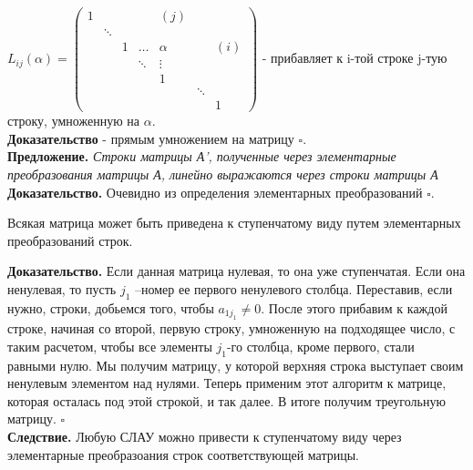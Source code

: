 $L_{ij}(\alpha)=
\left(\begin{array}{ccccccc}
1&&&&(j)&&\\
&\ddots&&&&&\\
&&1&\ldots&\alpha&&(i)\\
&&&\ddots&\vdots&&\\
&&&&1&&\\
&&&&&\ddots&\\
&&&&&&1
\end{array}\right)
$ - прибавляет к i-той строке j-тую строку, умноженную на $\alpha$.\\
\textbf{Доказательство} - прямым умножением на матрицу $\square$.\\
\textbf{Предложение.} \textit{Строки матрицы А’, полученные через элементарные
преобразования матрицы А, линейно выражаются через строки матрицы А}\\
\textbf{Доказательство.} Очевидно из определения элементарных преобразований
$\square$.
\begin{theor} \label{priv}
Всякая матрица может быть приведена к ступенчатому виду путем элементарных
преобразований строк.
\end{theor}
\textbf{Доказательство.} Если данная матрица нулевая, то она уже ступенчатая.
Если она ненулевая, то пусть $j_1$ –номер ее первого
ненулевого столбца. Переставив, если нужно, строки, добьемся того,
чтобы $a_{1j_1}\ne0$. После этого прибавим к каждой строке, начиная со второй,
первую строку, умноженную на подходящее число, с таким
расчетом, чтобы все элементы $j_1$-го столбца, кроме первого, стали
равными нулю. Мы получим матрицу, у которой верхняя строка выступает своим
ненулевым элементом над нулями. Теперь применим этот алгоритм к матрице, 
которая осталась под этой строкой, и так далее. В итоге получим треугольную 
матрицу. $\square$\\
\textbf{Следствие.} Любую СЛАУ можно привести к ступенчатому виду через 
элементарные преобразоания строк соответствующей матрицы.
